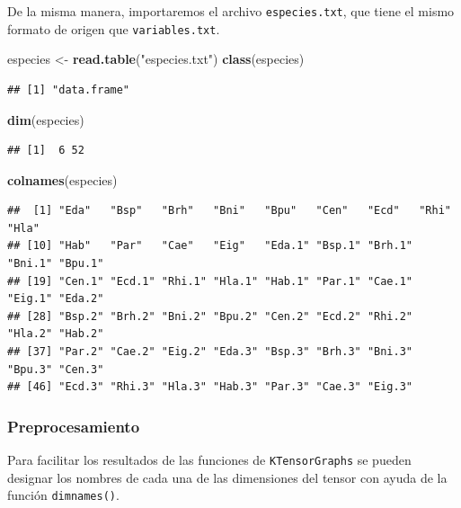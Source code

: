 \documentclass[
  spanish,
]{article}
\newenvironment{Shaded}{\begin{snugshade}}{\end{snugshade}}
\newcommand{\KeywordTok}[1]{\textcolor[rgb]{0.13,0.29,0.53}{\textbf{#1}}}
\newcommand{\NormalTok}[1]{#1}
\newcommand{\StringTok}[1]{\textcolor[rgb]{0.31,0.60,0.02}{#1}}
\begin{document}
De la misma manera, importaremos el archivo \texttt{especies.txt}, que tiene el mismo formato de origen que \texttt{variables.txt}.

\begin{Shaded}
\begin{Highlighting}[]
\NormalTok{especies \textless{}{-}}\StringTok{ }\KeywordTok{read.table}\NormalTok{(}\StringTok{"especies.txt"}\NormalTok{)}
\KeywordTok{class}\NormalTok{(especies)}
\end{Highlighting}
\end{Shaded}

\begin{verbatim}
## [1] "data.frame"
\end{verbatim}

\begin{Shaded}
\begin{Highlighting}[]
\KeywordTok{dim}\NormalTok{(especies)}
\end{Highlighting}
\end{Shaded}

\begin{verbatim}
## [1]  6 52
\end{verbatim}

\begin{Shaded}
\begin{Highlighting}[]
\KeywordTok{colnames}\NormalTok{(especies)}
\end{Highlighting}
\end{Shaded}

\begin{verbatim}
##  [1] "Eda"   "Bsp"   "Brh"   "Bni"   "Bpu"   "Cen"   "Ecd"   "Rhi"   "Hla"  
## [10] "Hab"   "Par"   "Cae"   "Eig"   "Eda.1" "Bsp.1" "Brh.1" "Bni.1" "Bpu.1"
## [19] "Cen.1" "Ecd.1" "Rhi.1" "Hla.1" "Hab.1" "Par.1" "Cae.1" "Eig.1" "Eda.2"
## [28] "Bsp.2" "Brh.2" "Bni.2" "Bpu.2" "Cen.2" "Ecd.2" "Rhi.2" "Hla.2" "Hab.2"
## [37] "Par.2" "Cae.2" "Eig.2" "Eda.3" "Bsp.3" "Brh.3" "Bni.3" "Bpu.3" "Cen.3"
## [46] "Ecd.3" "Rhi.3" "Hla.3" "Hab.3" "Par.3" "Cae.3" "Eig.3"
\end{verbatim}

\hypertarget{preprocesamiento}{%
\subsubsection{Preprocesamiento}\label{preprocesamiento}}

Para facilitar los resultados de las funciones de \texttt{KTensorGraphs} se pueden designar los nombres de cada una de las dimensiones del tensor con ayuda de la función \texttt{dimnames()}.
\end{document}
